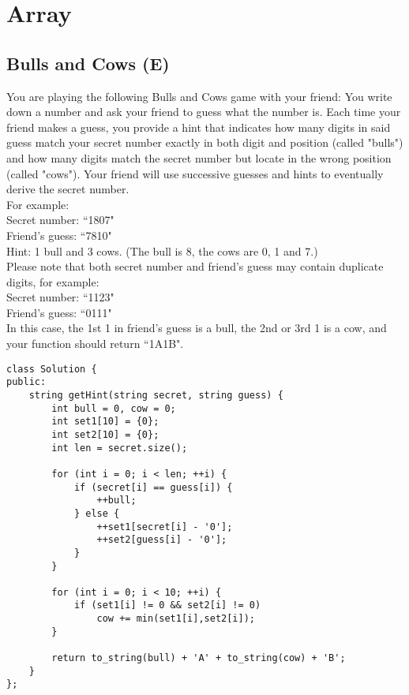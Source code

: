\chapter{Array}
\section{Bulls and Cows (E)}
You are playing the following Bulls and Cows game with your friend: You write down a number and ask your friend to guess what the number is. Each time your friend makes a guess, you provide a hint that indicates how many digits in said guess match your secret number exactly in both digit and position (called "bulls") and how many digits match the secret number but locate in the wrong position (called "cows"). Your friend will use successive guesses and hints to eventually derive the secret number.\\

For example:\\
Secret number:  ``1807"\\
Friend's guess: ``7810"\\
Hint: 1 bull and 3 cows. (The bull is 8, the cows are 0, 1 and 7.) \\

Please note that both secret number and friend's guess may contain duplicate digits, for example:\\
Secret number:  ``1123"\\
Friend's guess: ``0111"\\
In this case, the 1st 1 in friend's guess is a bull, the 2nd or 3rd 1 is a cow, and your function should return ``1A1B". \\

\begin{lstlisting}
class Solution {
public:
    string getHint(string secret, string guess) {
        int bull = 0, cow = 0;
        int set1[10] = {0};
        int set2[10] = {0};
        int len = secret.size();
        
        for (int i = 0; i < len; ++i) {
            if (secret[i] == guess[i]) {
                ++bull;
            } else {
                ++set1[secret[i] - '0'];    
                ++set2[guess[i] - '0']; 
            }
        }
        
        for (int i = 0; i < 10; ++i) {
            if (set1[i] != 0 && set2[i] != 0)
                cow += min(set1[i],set2[i]);
        }
    
        return to_string(bull) + 'A' + to_string(cow) + 'B';
    }
};
\end{lstlisting}


